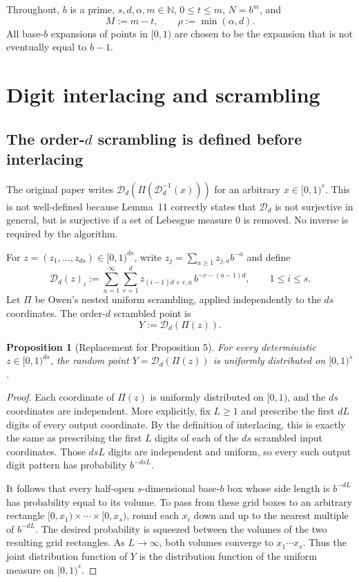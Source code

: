 \documentclass[11pt]{article}
\newtheorem{proposition}[theorem]{Proposition}
\newcommand{\N}{\mathbb N}
\newcommand{\D}{\mathcal D}
\begin{document}
Throughout, $b$ is a prime, $s,d,\alpha,m\in\N$, $0\le t\le m$,
$N=b^m$, and
\[
  M:=m-t,\qquad \rho:=\min(\alpha,d).
\]
All base-$b$ expansions of points in $[0,1)$ are chosen to be the expansion that
is not eventually equal to $b-1$.

\section{Digit interlacing and scrambling}

\subsection{The order-\texorpdfstring{$d$}{d} scrambling is defined before interlacing}

The original paper writes $\D_d(\Pi(\D_d^{-1}(x)))$ for an arbitrary
$x\in[0,1)^s$.  This is not well-defined because Lemma~11 correctly states that
$\D_d$ is not surjective in general, but is surjective if a set of Lebesgue measure $0$ is removed.  No inverse is required by the algorithm.

For $z=(z_1,\ldots,z_{ds})\in[0,1)^{ds}$, write
$z_j=\sum_{a\ge1}z_{j,a}b^{-a}$ and define
\[
 \D_d(z)_i
 :=\sum_{a=1}^{\infty}\sum_{r=1}^{d}
     z_{(i-1)d+r,a}\,b^{-r-(a-1)d},
 \qquad 1\le i\le s.
\]
Let $\Pi$ be Owen's nested uniform scrambling, applied independently to the
$ds$ coordinates.  The order-$d$ scrambled point is
\begin{equation}\label{eq:correct-order-d-scramble}
  Y:=\D_d(\Pi(z)).
\end{equation}

\begin{proposition}[Replacement for Proposition 5]\label{prop:uniform}
For every deterministic $z\in[0,1)^{ds}$, the random point
$Y=\D_d(\Pi(z))$ is uniformly distributed on $[0,1)^s$.
\end{proposition}

\begin{proof}
Each coordinate of $\Pi(z)$ is uniformly distributed on $[0,1)$, and the
$ds$ coordinates are independent.  More explicitly, fix $L\ge1$ and prescribe
the first $dL$ digits of every output coordinate.  By the definition of
interlacing, this is exactly the same as prescribing the first $L$ digits of
each of the $ds$ scrambled input coordinates.  Those $dsL$ digits are
independent and uniform, so every such output digit pattern has probability
$b^{-dsL}$.

It follows that every half-open $s$-dimensional base-$b$ box whose side length
is $b^{-dL}$ has probability equal to its volume.  To pass from these grid
boxes to an arbitrary rectangle
$[0,x_1)\times\cdots\times[0,x_s)$, round each $x_i$ down and up to the nearest
multiple of $b^{-dL}$.  The desired probability is squeezed between the
volumes of the two resulting grid rectangles.  As $L\to\infty$, both volumes
converge to $x_1\cdots x_s$.  Thus the joint distribution function of $Y$ is
the distribution function of the uniform measure on $[0,1)^s$.
\end{proof}
\end{document}
